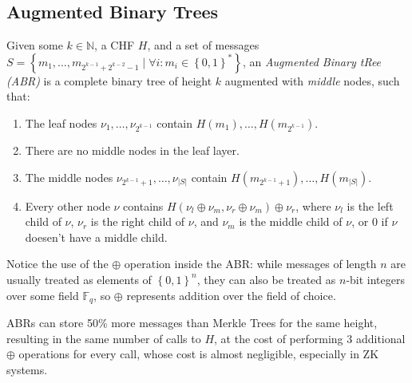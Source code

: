 \subsection{Augmented Binary Trees}
\begin{definition}
	Given some \(k \in \mathbb{N}\), a CHF \(H\), and a set of messages
	\(S = \left\{m_1, \dots, m_{2^{k-1} + 2^{k-2}-1} \mid \forall i\colon m_i \in
	{\left\{0, 1\right\}}^*\right\} \),
	an \emph{Augmented Binary tRee (ABR)} is a complete binary tree of
	height \(k\) augmented with \emph{middle} nodes, such that:
	\begin{enumerate}
		\item The leaf nodes \(\nu_{1}, \dots, \nu_{2^{k-1}}\) contain \(H\left(m_1\right), \dots,
		      H\left(m_{2^{k-1}}\right)\).
		\item There are no middle nodes in the leaf layer.
		\item The middle nodes \(\nu_{2^{k-1}+1}, \dots, \nu_{\left|S\right|}\) contain
		      \(H\left(m_{2^{k-1}+1}\right), \dots, H\left(m_{\left|S\right|}\right)\).
		\item Every other node \(\nu \) contains \(H\left(\nu_l \oplus \nu_m, \nu_r \oplus
		      \nu_m\right) \oplus \nu_r \), where \(\nu_l\) is the left child of \(\nu \), \(\nu_r\)
		      is the right child of \(\nu \), and \(\nu_m\) is the middle child of \(\nu \), or \(0\)
		      if \(\nu \) doesen't have a middle child.
	\end{enumerate}
\end{definition}

Notice the use of the \(\oplus \) operation inside the ABR\@: while messages of length 
\(n\) are usually treated as elements of \({\left\{0, 1\right\}}^n\), they can also be treated as 
\(n\)-bit integers over some field \(\mathbb{F}_q\), so \(\oplus \) represents addition over the 
field of choice.

ABRs can store 50\% more messages than Merkle Trees for the same height, resulting in the same 
number of calls to \(H\), at the cost of performing 3 additional \(\oplus \) operations for
every call, whose cost is almost negligible, especially in ZK systems.

